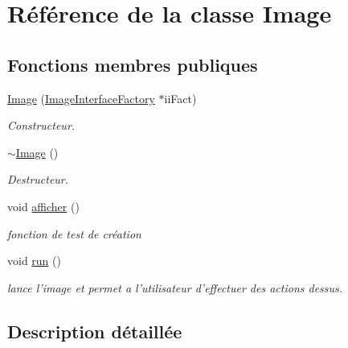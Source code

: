 \hypertarget{classImage}{\section{Référence de la classe Image}
\label{classImage}
}
\subsection*{Fonctions membres publiques}
\begin{DoxyCompactItemize}
\item 
\hyperlink{classImage_a2e8f8d5193e5c6e49de276f9d1f4bdde}{Image} (\hyperlink{classImageInterfaceFactory}{Image\+Interface\+Factory} $\ast$ii\+Fact)
\begin{DoxyCompactList}\small\item\em Constructeur. \end{DoxyCompactList}\item 
\hypertarget{classImage_a0294f63700543e11c0f0da85601c7ae5}{\hyperlink{classImage_a0294f63700543e11c0f0da85601c7ae5}{$\sim$\+Image} ()}\label{classImage_a0294f63700543e11c0f0da85601c7ae5}

\begin{DoxyCompactList}\small\item\em Destructeur. \end{DoxyCompactList}\item 
\hypertarget{classImage_a4d957034ad17e3911a4d9f7decdda22c}{void \hyperlink{classImage_a4d957034ad17e3911a4d9f7decdda22c}{afficher} ()}\label{classImage_a4d957034ad17e3911a4d9f7decdda22c}

\begin{DoxyCompactList}\small\item\em fonction de test de création \end{DoxyCompactList}\item 
\hypertarget{classImage_a0ee0602472090d8723d081849dfe6e27}{void \hyperlink{classImage_a0ee0602472090d8723d081849dfe6e27}{run} ()}\label{classImage_a0ee0602472090d8723d081849dfe6e27}

\begin{DoxyCompactList}\small\item\em lance l'image et permet a l'utilisateur d'effectuer des actions dessus. \end{DoxyCompactList}\end{DoxyCompactItemize}


\subsection{Description détaillée}


